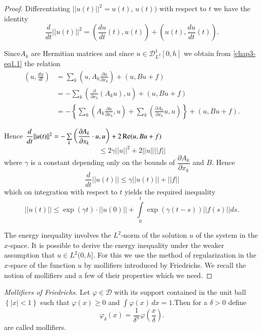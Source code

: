 \begin{proof}
Differentiating $|| u(t) ||^2 = u(t)$,  $u(t))$ with respect to $t$ we
have the identity 
$$
\frac{d}{dt}||u (t)||^2 = \left(\frac{du}{dt}(t),  u(t)\right) + \left(u(t),
\frac{du}{dt}(t)\right). 
$$

Since\pageoriginale $A_k$ are Hermitian matrices and since $u
\in \mathscr{D}^1_{L^2} [0, h]$ we obtain from \eqref{chap3-eq1.1} the
relation   
 \begin{align*}
\left(u,  \frac{du}{dt}\right) & =\sum_k \left(u,  A_k \frac{\partial
  u}{\partial x_k}\right) + (u,  Bu + f)\\ 
& = - \sum_k \left(\frac{\partial}{\partial x_k} (A_k u), u\right) + (u,  Bu +
   f)\\ 
& = - \left\{\sum_k \left(A_k \frac{\partial u}{\partial x_k},
   u\right) + \sum_k \left(\frac{\partial A_k}{\partial x_k} u,
   u\right)\right\} +(u,  Bu+ f).   
 \end{align*} 

 Hence $\dfrac{d}{dt}|| u(t) ||^2 = - \sum\limits_k \left(\dfrac{\partial
   A_k} {\partial x_k}\cdot u,  u\right)+ 2 \operatorname{Re} (u,  Bu + f)$ 
 $$
 \leq 2 \gamma ||u||^2 + 2 || u || || f ||
 $$
where $\gamma$ is a constant depending only on the bounds of
$\dfrac{\partial A_k}{\partial x_k}$ and $B$.  Hence  
 $$
 \frac{d}{dt} || u(t) || \leq \gamma || u(t) || + ||f||
 $$
which on integration with respect to $t$ yields the required inequality
$$
||u(t)|| \leq \exp (\gamma t) \cdot || u(0)|| + \int\limits^t_0 \exp
(\gamma (t-s)) || f(s) || ds. 
$$

The energy inequality involves the $L^2$-norm of the solution $u$ of
the system in the $x$-space. It is possible to derive the energy
inequality under the weaker assumption that $u \in L^2 (0,
h]$. For this we use the method of regularization in the $x$-space
  of the function $u$ by mollifiers introduced by Friedrichs. We
  recall the notion of mollifiers and a few of their properties which
  we need. 
\end{proof}

\begin{defi*}
{\em Mollifiers of Friedrichs}. Let $\varphi \in \mathscr{D}$
with its support contained in the unit ball $\left \{ |x| < 1 
\right\}$ such that $\varphi (x) \geq 0$ and $ \int \varphi (x) \, dx
=1$.\pageoriginale Then for a $ \delta > 0$ define  
$$
\varphi_\delta (x)= \frac{1}{\delta^n} \varphi
\left(\frac{x}{\delta}\right).   
$$\pageoriginale
are called mollifiers.
\end{defi*}

